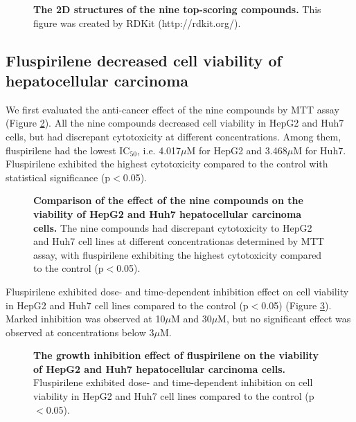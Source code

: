 \documentclass[10pt,letterpaper]{article}
\begin{document}
\begin{figure}%
\caption{{\bf The 2D structures of the nine top-scoring compounds.} This figure was created by RDKit (http://rdkit.org/). }
\label{Top9Structures}
\end{figure}

\subsection*{Fluspirilene decreased cell viability of hepatocellular carcinoma}

We first evaluated the anti-cancer effect of the nine compounds by MTT assay (Figure \ref{CellViabilityAgainstConcentration}). All the nine compounds decreased cell viability in HepG2 and Huh7 cells, but had discrepant cytotoxicity at different concentrations. Among them, fluspirilene had the lowest IC$_{50}$, i.e. 4.017$\mu$M for HepG2 and 3.468$\mu$M for Huh7. Fluspirilene exhibited the highest cytotoxicity compared to the control with statistical significance (p$<$0.05).

\begin{figure}%
\caption{{\bf Comparison of the effect of the nine compounds on the viability of HepG2 and Huh7 hepatocellular carcinoma cells.} The nine compounds had discrepant cytotoxicity to HepG2 and Huh7 cell lines at different concentrationas determined by MTT assay, with fluspirilene exhibiting the highest cytotoxicity compared to the control (p$<$0.05).}
\label{CellViabilityAgainstConcentration}
\end{figure}

Fluspirilene exhibited dose- and time-dependent inhibition effect on cell viability in HepG2 and Huh7 cell lines compared to the control (p$<$0.05) (Figure \ref{CellViabilityAgainstTime}). Marked inhibition was observed at 10$\mu$M and 30$\mu$M, but no significant effect was observed at concentrations below 3$\mu$M.

\begin{figure}%
\caption{{\bf The growth inhibition effect of fluspirilene on the viability of HepG2 and Huh7 hepatocellular carcinoma cells.} Fluspirilene exhibited dose- and time-dependent inhibition on cell viability in HepG2 and Huh7 cell lines compared to the control (p$<$0.05).}
\label{CellViabilityAgainstTime}
\end{figure}
\end{document}

